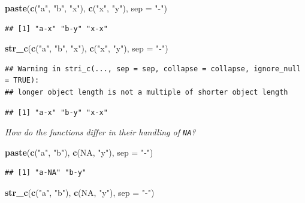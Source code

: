 \documentclass[]{book}
\newenvironment{Shaded}{\begin{snugshade}}{\end{snugshade}}
\newcommand{\DataTypeTok}[1]{\textcolor[rgb]{0.13,0.29,0.53}{#1}}
\newcommand{\KeywordTok}[1]{\textcolor[rgb]{0.13,0.29,0.53}{\textbf{#1}}}
\newcommand{\NormalTok}[1]{#1}
\newcommand{\OtherTok}[1]{\textcolor[rgb]{0.56,0.35,0.01}{#1}}
\newcommand{\StringTok}[1]{\textcolor[rgb]{0.31,0.60,0.02}{#1}}
\theoremstyle{definition}
\theoremstyle{definition}
\theoremstyle{definition}
\theoremstyle{remark}
\begin{document}
\begin{enumerate}
\begin{Shaded}
\begin{Highlighting}[]
\KeywordTok{paste}\NormalTok{(}\KeywordTok{c}\NormalTok{(}\StringTok{"a"}\NormalTok{, }\StringTok{"b"}\NormalTok{, }\StringTok{"x"}\NormalTok{), }\KeywordTok{c}\NormalTok{(}\StringTok{"x"}\NormalTok{, }\StringTok{"y"}\NormalTok{), }\DataTypeTok{sep =} \StringTok{"-"}\NormalTok{)}
\end{Highlighting}
\end{Shaded}

\begin{verbatim}
## [1] "a-x" "b-y" "x-x"
\end{verbatim}

\begin{Shaded}
\begin{Highlighting}[]
\KeywordTok{str_c}\NormalTok{(}\KeywordTok{c}\NormalTok{(}\StringTok{"a"}\NormalTok{, }\StringTok{"b"}\NormalTok{, }\StringTok{"x"}\NormalTok{), }\KeywordTok{c}\NormalTok{(}\StringTok{"x"}\NormalTok{, }\StringTok{"y"}\NormalTok{), }\DataTypeTok{sep =} \StringTok{"-"}\NormalTok{)}
\end{Highlighting}
\end{Shaded}

\begin{verbatim}
## Warning in stri_c(..., sep = sep, collapse = collapse, ignore_null = TRUE):
## longer object length is not a multiple of shorter object length
\end{verbatim}

\begin{verbatim}
## [1] "a-x" "b-y" "x-x"
\end{verbatim}

  \emph{How do the functions differ in their handling of \texttt{NA}?}

\begin{Shaded}
\begin{Highlighting}[]
\KeywordTok{paste}\NormalTok{(}\KeywordTok{c}\NormalTok{(}\StringTok{"a"}\NormalTok{, }\StringTok{"b"}\NormalTok{), }\KeywordTok{c}\NormalTok{(}\OtherTok{NA}\NormalTok{, }\StringTok{"y"}\NormalTok{), }\DataTypeTok{sep =} \StringTok{"-"}\NormalTok{)}
\end{Highlighting}
\end{Shaded}

\begin{verbatim}
## [1] "a-NA" "b-y"
\end{verbatim}

\begin{Shaded}
\begin{Highlighting}[]
\KeywordTok{str_c}\NormalTok{(}\KeywordTok{c}\NormalTok{(}\StringTok{"a"}\NormalTok{, }\StringTok{"b"}\NormalTok{), }\KeywordTok{c}\NormalTok{(}\OtherTok{NA}\NormalTok{, }\StringTok{"y"}\NormalTok{), }\DataTypeTok{sep =} \StringTok{"-"}\NormalTok{)}
\end{Highlighting}
\end{Shaded}


\end{enumerate}
\end{document}
